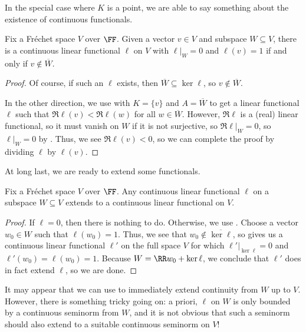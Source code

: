 \documentclass[notes.tex]{subfiles}
\begin{document}
In the special case where $K$ is a point, we are able to say something about the existence of continuous functionals.
\begin{corollary} \label{cor:subspace-closure-by-func}
	Fix a Fr\'echet space $V$ over $\FF$. Given a vector $v\in V$ and subspace $W\subseteq V$, there is a continuous linear functional $\ell$ on $V$ with $\ell|_W=0$ and $\ell(v)=1$ if and only if $v\notin\overline W$.
\end{corollary}
\begin{proof}
	Of course, if such an $\ell$ exists, then $\overline W\subseteq\ker\ell$, so $v\notin\overline W$.

	In the other direction, we use  with $K=\{v\}$ and $A=\overline W$ to get a linear functional $\ell$ such that $\Re\ell(v)<\Re\ell(w)$ for all $w\in\overline W$. However, $\Re\ell$ is a (real) linear functional, so it must vanish on $W$ if it is not surjective, so $\Re\ell|_W=0$, so $\ell|_W=0$ by . Thus, we see $\Re\ell(v)<0$, so we can complete the proof by dividing $\ell$ by $\ell(v)$.
\end{proof}
At long last, we are ready to extend some functionals.
\begin{corollary} \label{cor:h-b-extend-cont}
	Fix a Fr\'echet space $V$ over $\FF$. Any continuous linear functional $\ell$ on a subspace $W\subseteq V$ extends to a continuous linear functional on $V$.
\end{corollary}
\begin{proof}
	If $\ell=0$, then there is nothing to do. Otherwise, we use . Choose a vector $w_0\in W$ such that $\ell(w_0)=1$. Thus, we see that $w_0\notin\overline{\ker\ell}$, so  gives us a continuous linear functional $\ell'$ on the full space $V$ for which $\ell'|_{\ker\ell}=0$ and $\ell'(w_0)=\ell(w_0)=1$. Because $W=\RR w_0+\ker\ell$, we conclude that $\ell'$ does in fact extend $\ell$, so we are done.
\end{proof}
\begin{remark}
	It may appear that we can use  to immediately extend continuity from $W$ up to $V$. However, there is something tricky going on: a priori, $\ell$ on $W$ is only bounded by a continuous seminorm from $W$, and it is not obvious that such a seminorm should also extend to a suitable continuous seminorm on $V$!
\end{remark}
\end{document}
